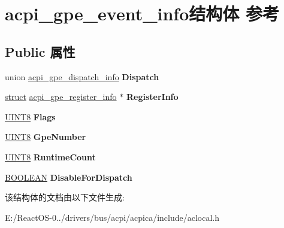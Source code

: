 \hypertarget{structacpi__gpe__event__info}{}\section{acpi\+\_\+gpe\+\_\+event\+\_\+info结构体 参考}
\label{structacpi__gpe__event__info}
\subsection*{Public 属性}
\begin{DoxyCompactItemize}
\item 
\mbox{\label{structacpi__gpe__event__info_aced70f3481c348e8129d176d781f658e}} 
union \hyperlink{unionacpi__gpe__dispatch__info}{acpi\+\_\+gpe\+\_\+dispatch\+\_\+info} {\bfseries Dispatch}
\item 
\mbox{\label{structacpi__gpe__event__info_ab5bada0448ba57e8d29d7d0c6b9b945b}} 
\hyperlink{interfacestruct}{struct} \hyperlink{structacpi__gpe__register__info}{acpi\+\_\+gpe\+\_\+register\+\_\+info} $\ast$ {\bfseries Register\+Info}
\item 
\mbox{\label{structacpi__gpe__event__info_ae5cb1523f7837ee8f8b79c8ef11ae9cb}} 
\hyperlink{_processor_bind_8h_ab27e9918b538ce9d8ca692479b375b6a}{U\+I\+N\+T8} {\bfseries Flags}
\item 
\mbox{\label{structacpi__gpe__event__info_af25b10c18a3e7a38c4612801aff789ce}} 
\hyperlink{_processor_bind_8h_ab27e9918b538ce9d8ca692479b375b6a}{U\+I\+N\+T8} {\bfseries Gpe\+Number}
\item 
\mbox{\label{structacpi__gpe__event__info_a27321cf2b688c8e3a3837ed4c19cfcfc}} 
\hyperlink{_processor_bind_8h_ab27e9918b538ce9d8ca692479b375b6a}{U\+I\+N\+T8} {\bfseries Runtime\+Count}
\item 
\mbox{\label{structacpi__gpe__event__info_ad840265fa1fdce7ffb8a75f75e2fc94a}} 
\hyperlink{_processor_bind_8h_a112e3146cb38b6ee95e64d85842e380a}{B\+O\+O\+L\+E\+AN} {\bfseries Disable\+For\+Dispatch}
\end{DoxyCompactItemize}


该结构体的文档由以下文件生成\+:\begin{DoxyCompactItemize}
\item 
E\+:/\+React\+O\+S-\/0../drivers/bus/acpi/acpica/include/aclocal.\+h\end{DoxyCompactItemize}

